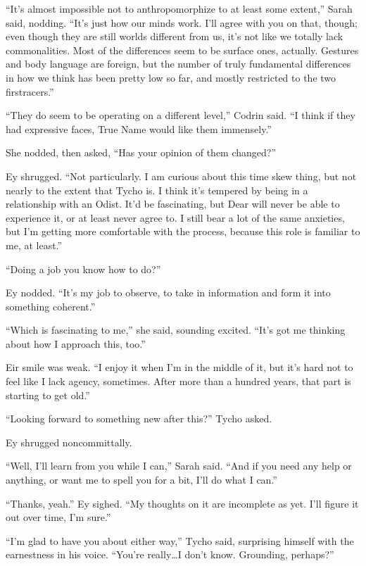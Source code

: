 ``It's almost impossible not to anthropomorphize to at least some extent,'' Sarah said, nodding. ``It's just how our minds work. I'll agree with you on that, though; even though they are still worlds different from us, it's not like we totally lack commonalities. Most of the differences seem to be surface ones, actually. Gestures and body language are foreign, but the number of truly fundamental differences in how we think has been pretty low so far, and mostly restricted to the two firstracers.''

``They do seem to be operating on a different level,'' Codrin said. ``I think if they had expressive faces, True Name would like them immensely.''

She nodded, then asked, ``Has your opinion of them changed?''

Ey shrugged. ``Not particularly. I am curious about this time skew thing, but not nearly to the extent that Tycho is. I think it's tempered by being in a relationship with an Odist. It'd be fascinating, but Dear will never be able to experience it, or at least never agree to. I still bear a lot of the same anxieties, but I'm getting more comfortable with the process, because this role is familiar to me, at least.''

``Doing a job you know how to do?''

Ey nodded. ``It's my job to observe, to take in information and form it into something coherent.''

``Which is fascinating to me,'' she said, sounding excited. ``It's got me thinking about how I approach this, too.''

Eir smile was weak. ``I enjoy it when I'm in the middle of it, but it's hard not to feel like I lack agency, sometimes. After more than a hundred years, that part is starting to get old.''

``Looking forward to something new after this?'' Tycho asked.

Ey shrugged noncommittally.

``Well, I'll learn from you while I can,'' Sarah said. ``And if you need any help or anything, or want me to spell you for a bit, I'll do what I can.''

``Thanks, yeah.'' Ey sighed. ``My thoughts on it are incomplete as yet. I'll figure it out over time, I'm sure.''

``I'm glad to have you about either way,'' Tycho said, surprising himself with the earnestness in his voice. ``You're really\ldots I don't know. Grounding, perhaps?''

